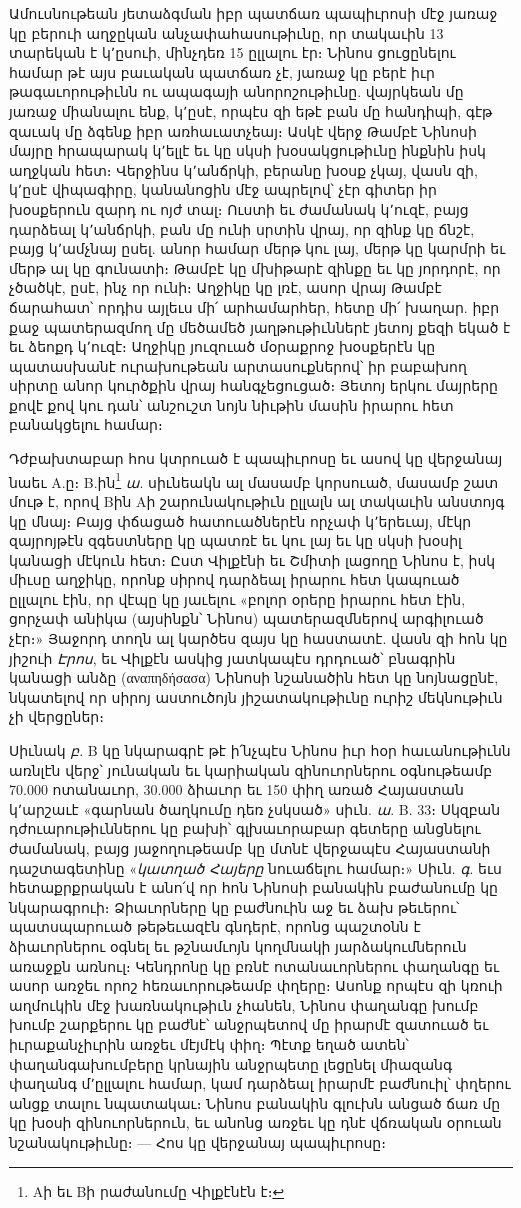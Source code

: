 \documentclass{article}
\begin{document}
{Ամուսնութեան յետաձգման իբր պատճառ պապիւրոսի մէջ յառաջ կը բերուի աղջըկան անչափահասութիւնը, որ տակաւին 13 տարեկան է կ՚ըսուի, մինչդեռ 15 ըլլալու էր։ Նինոս ցուցընելու համար թէ այս բաւական պատճառ չէ, յառաջ կը բերէ իւր թագաւորութիւնն ու ապագայի անորոշութիւնը. վայրկեան մը յառաջ միանալու ենք, կ՚ըսէ, որպէս զի եթէ բան մը հանդիպի, գէթ զաւակ մը ձգենք իբր առհաւատչեայ։ Ասկէ վերջ Թամբէ Նինոսի մայրը հրապարակ կ՚ելլէ եւ կը սկսի խօսակցութիւնը ինքնին իսկ աղջկան հետ։ Վերջինս կ՚անճրկի, բերանը խօսք չկայ, վասն զի, կ՚ըսէ վիպագիրը, կանանոցին մէջ ապրելով՝ չէր գիտեր իր խօսքերուն զարդ ու ոյժ տալ։ Ուստի եւ ժամանակ կ՚ուզէ, բայց դարձեալ կ՚անճրկի, բան մը ունի սրտին վրայ, որ զինք կը ճնշէ, բայց կ՚ամչնայ ըսել. անոր համար մերթ կու լայ, մերթ կը կարմրի եւ մերթ ալ կը գունատի։ Թամբէ կը մխիթարէ զինքը եւ կը յորդորէ, որ չծածկէ, ըսէ, ինչ որ ունի։ Աղջիկը կը լռէ, ասոր վրայ Թամբէ ճարահատ՝ որդիս այլեւս մի՛ արհամարհեր, հետը մի՛ խաղար. իբր քաջ պատերազմող մը մեծամեծ յաղթութիւններէ յետոյ քեզի եկած է եւ ձեոքդ կ՚ուզէ։ Աղջիկը յուզուած մօրաքրոջ խօսքերէն կը պատասխանէ ուրախութեան արտասուքներով՝ իր բաբախող սիրտը անոր կուրծքին վրայ հանգչեցուցած։ Յետոյ երկու մայրերը քովէ քով կու դան՝ անշուշտ նոյն նիւթին մասին իրարու հետ բանակցելու համար։

Դժբախտաբար հոս կտրուած է պապիւրոսը եւ ասով կը վերջանայ նաեւ Α.ը։ Β.ին\footnote{Αի եւ Βի րաժանումը Վիլքէնէն է։} \emph{ա}. սիւնեակն ալ մասամբ կորսուած, մասամբ շատ մութ է, որով Βին Αի շարունակութիւն ըլլալն ալ տակաւին անստոյգ կը մնայ։ Բայց փճացած հատուածներէն որչափ կ՚երեւայ, մէկր զայրոյթէն զգեստները կը պատռէ եւ կու լայ եւ կը սկսի խօսիլ կանացի մէկուն հետ։ Ըստ Վիլքէնի եւ Շմիտի լացողը Նինոս է, իսկ միւսը աղջիկը, որոնք սիրով դարձեալ իրարու հետ կապուած ըլլալու էին, որ վէպը կը յաւելու «բոլոր օրերը իրարու հետ էին, ցորչափ անիկա (այսինքն՝ Նինոս) պատերազմներով արգիլուած չէր։» Յաջորդ տողն ալ կարծես զայս կը հաստատէ. վասն զի հոն կը յիշուի \emph{Էրոս}, եւ Վիլքէն ասկից յատկապէս դրդուած՝ բնագրին կանացի անձը (αναπηδήσασα) Նինոսի նշանածին հետ կը նոյնացընէ, նկատելով որ սիրոյ աստուծոյն յիշատակութիւնը ուրիշ մեկնութիւն չի վերցըներ։

Սիւնակ \emph{բ}. Β կը նկարագրէ թէ ի՛նչպէս Նինոս իւր հօր հաւանութիւնն առնլէն վերջ՝ յունական եւ կարիական զինուորներու օգնութեամբ 70.000 ոտանաւոր, 30.000 ձիաւոր եւ 150 փիղ առած Հայաստան կ՚արշաւէ «գարնան ծաղկումը դեռ չսկսած» սիւն. \emph{ա}. Β. 33։ Սկզբան դժուարութիւններու կը բախի՝ գլխաւորաբար գետերը անցնելու ժամանակ, բայց յաջողութեամբ կը մտնէ վերջապէս Հայաստանի դաշտագետինը «\emph{կատղած Հայերը} նուաճելու համար։» Սիւն. \emph{գ}. եւս հետաքրքրական է անո՛վ որ հոն Նինոսի բանակին բաժանումը կը նկարագրուի։ Ձիաւորները կը բաժնուին աջ եւ ձախ թեւերու՝ պատսպարուած թեթեւազէն գնդերէ, որոնց պաշտօնն է ձիաւորներու օգնել եւ թշնամւոյն կողմնակի յարձակումներուն առաջքն առնուլ։ Կենդրոնը կը բռնէ ոտանաւորներու փաղանգը եւ ասոր առջեւ որոշ հեռաւորութեամբ փղերը։ Ասոնք որպէս զի կռուի աղմուկին մէջ խառնակութիւն չհանեն, Նինոս փաղանգը խումբ խումբ շարքերու կը բաժնէ՝ անջրպետով մը իրարմէ զատուած եւ իւրաքանչիւրին առջեւ մէյմէկ փիղ։ Պէտք եղած ատեն՝ փաղանգախումբերը կրնային անջրպետը լեցընել միազանգ փաղանգ մ՚ըլլալու համար, կամ դարձեալ իրարմէ բաժնուիլ՝ փղերու անցք տալու նպատակաւ։ Նինոս բանակին գլուխն անցած ճառ մը կը խօսի զինուորներուն, եւ անոնց առջեւ կը դնէ վճռական օրուան նշանակութիւնը։ — Հոս կը վերջանայ պապիւրոսը։

}
\end{document}
